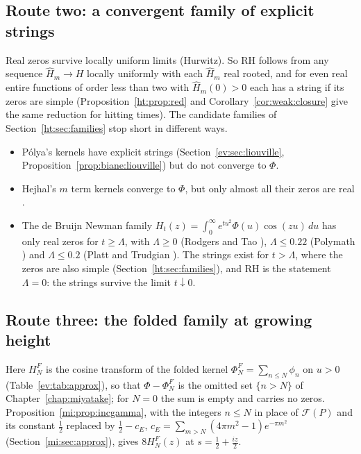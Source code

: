 \subsection{Route two: a convergent family of explicit strings}
Real zeros survive locally uniform limits (Hurwitz). So RH follows from any sequence $\widehat H_m\to H$ locally uniformly with each $\widehat H_m$ real rooted, and for even real entire functions of order less than two with $\widehat H_m(0)>0$ each has a string if its zeros are simple (Proposition~\ref{ht:prop:red} and Corollary~\ref{cor:weak:closure} give the same reduction for hitting times). The candidate families of Section~\ref{ht:sec:families} stop short in different ways.
\begin{itemize}
\item P\'olya's kernels have explicit strings (Section~\ref{ev:sec:liouville}, Proposition~\ref{prop:biane:liouville}) but do not converge to $\Phi$.
\item Hejhal's $m$ term kernels converge to $\Phi$, but only almost all their zeros are real \cite{Hejhal90}. %
\item The de Bruijn Newman family $H_t(z)=\int_0^\infty e^{tu^2}\Phi(u)\cos(zu)\,du$ has only real zeros for $t\ge\Lambda$, with $\Lambda\ge0$ (Rodgers and Tao \cite{RodgersTao}), $\Lambda\le0.22$ (Polymath \cite{Polymath}) and $\Lambda\le0.2$ (Platt and Trudgian \cite{PT21}). The strings exist for $t>\Lambda$, where the zeros are also simple (Section~\ref{ht:sec:families}), and RH is the statement $\Lambda=0$: the strings survive the limit $t\downarrow0$.
\end{itemize}

\subsection{Route three: the folded family at growing height}
Here $H^F_N$ is the cosine transform of the folded kernel $\Phi^F_N=\sum_{n\le N}\phi_n$ on $u>0$ (Table~\ref{ev:tab:approx}), so that $\Phi-\Phi^F_N$ is the omitted set $\{n>N\}$ of Chapter~\ref{chap:miyatake}; for $N=0$ the sum is empty and carries no zeros. Proposition~\ref{mi:prop:incgamma}, with the integers $n\le N$ in place of $\mathcal F(P)$ and its constant $\tfrac12$ replaced by $\tfrac12-c_E$, $c_E=\sum_{m>N}(4\pi m^2-1)e^{-\pi m^2}$ (Section~\ref{mi:sec:approx}), gives $8H^F_N(z)$ at $s=\tfrac12+\tfrac{iz}2$.

